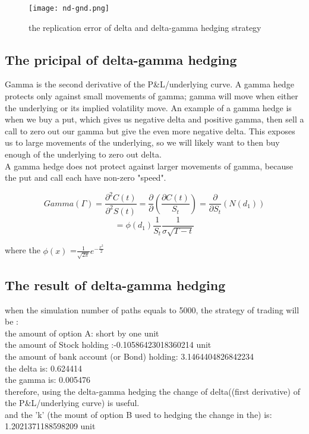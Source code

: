 \documentclass[14pt]{extarticle}
\begin{document}
\begin{figure}[h] 
    \centering 
    \texttt{[image: nd-gnd.png]}
\caption{ the replication error of delta and delta-gamma hedging strategy}
 \end{figure}


\newpage
\subsection{The pricipal of delta-gamma hedging}
Gamma is the second derivative of the P\&L/underlying curve. A gamma hedge protects only against small movements of gamma; gamma will move when either the underlying or its implied volatility move. An example of a gamma hedge is when we buy a put, which gives us negative delta and positive gamma, then sell a call to zero out our gamma but give the even more negative delta. This exposes us to large movements of the underlying, so we will likely want to then buy enough of the underlying to zero out  delta. \\
A gamma hedge does not protect against larger movements of gamma, because the put and call each have non-zero "speed".

$$Gamma(\Gamma)=  \frac{\partial^2 C(t)}  {\partial^2 S(t)}   =\frac{\partial}{\partial} (\frac{\partial C(t)}   {S_t})       =   \frac{\partial }{\partial S_t}(N(d_1))       $$
$$    =\phi(d_1) \frac{1}{S_t} \frac{ 1 }{\sigma \sqrt{T-t}  }  $$


where the $\phi(x)$ =$ \frac{1} {\sqrt{2\pi}} e^{-\frac{ x^2} {2}}$
\subsection{The result of delta-gamma hedging}
when the simulation number of paths equals to 5000, the strategy of trading will be :\\
the amount of option A: short by one unit\\
the amount of Stock holding :-0.10586423018360214 unit\\
the amount of bank account (or Bond) holding: 3.1464404826842234 \\
the delta is: 0.624414 \\
the gamma is: 0.005476\\
therefore, using the delta-gamma hedging the change of delta((first derivative) of the P\&L/underlying curve) is useful.\\
and the 'k' (the mount of option B used to hedging the change in the) is: 1.2021371188598209 unit
\end{document}
